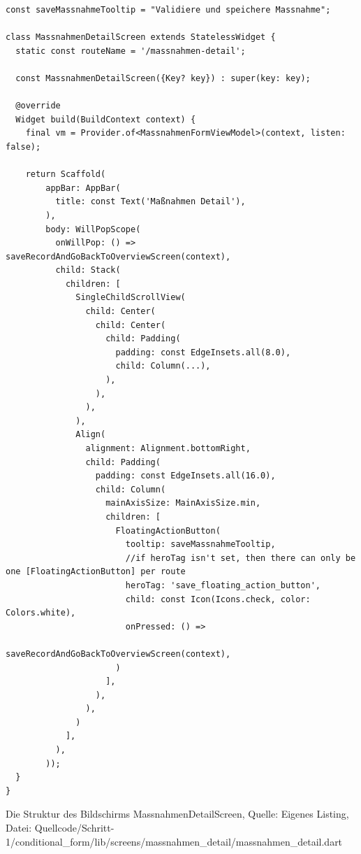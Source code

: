 \begin{listing}[htbp]
    \begin{verbatim}
const saveMassnahmeTooltip = "Validiere und speichere Massnahme";

class MassnahmenDetailScreen extends StatelessWidget {
  static const routeName = '/massnahmen-detail';

  const MassnahmenDetailScreen({Key? key}) : super(key: key);

  @override
  Widget build(BuildContext context) {
    final vm = Provider.of<MassnahmenFormViewModel>(context, listen: false);

    return Scaffold(
        appBar: AppBar(
          title: const Text('Maßnahmen Detail'),
        ),
        body: WillPopScope(
          onWillPop: () => saveRecordAndGoBackToOverviewScreen(context),
          child: Stack(
            children: [
              SingleChildScrollView(
                child: Center(
                  child: Center(
                    child: Padding(
                      padding: const EdgeInsets.all(8.0),
                      child: Column(...),
                    ),
                  ),
                ),
              ),
              Align(
                alignment: Alignment.bottomRight,
                child: Padding(
                  padding: const EdgeInsets.all(16.0),
                  child: Column(
                    mainAxisSize: MainAxisSize.min,
                    children: [
                      FloatingActionButton(
                        tooltip: saveMassnahmeTooltip,
                        //if heroTag isn't set, then there can only be one [FloatingActionButton] per route
                        heroTag: 'save_floating_action_button',
                        child: const Icon(Icons.check, color: Colors.white),
                        onPressed: () =>
                            saveRecordAndGoBackToOverviewScreen(context),
                      )
                    ],
                  ),
                ),
              )
            ],
          ),
        ));
  }
}
\end{verbatim}
\caption[Schritt 1 Klasse MassnahmenDetailScreen Struktur]{Die Struktur des Bildschirms MassnahmenDetailScreen, Quelle: Eigenes Listing, \newline Datei: Quellcode/Schritt-1/conditional_form/lib/\newline screens/massnahmen_detail/massnahmen_detail.dart}
\label{lst:Schritt1KlasseMassnahmenDetailScreenStruktur}
\end{listing}

